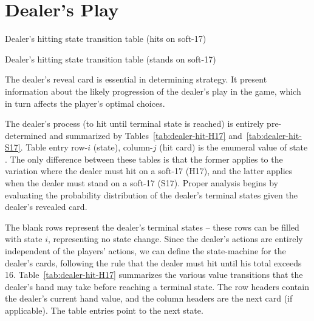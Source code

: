 \section{Dealer's Play}
\label{sec:rules:dealer-play}

\begin{table}[ht!]
\caption{Dealer's hitting state transition table (hits on soft-17)}
\begin{center}

\end{center}
\label{tab:dealer-hit-H17}
\end{table}

\begin{table}[ht!]
\caption{Dealer's hitting state transition table (stands on soft-17)}
\begin{center}

\end{center}
\label{tab:dealer-hit-S17}
\end{table}

The dealer's reveal card is essential in determining strategy.
It present information about the likely progression of the dealer's
play in the game, which in turn affects the player's optimal choices.

The dealer's process (to hit until terminal state is reached)
is entirely pre-determined and summarized by Tables~\ref{tab:dealer-hit-H17}
and~\ref{tab:dealer-hit-S17}.
Table entry row-$i$ (state), column-$j$ (hit card) is the enumeral value
of state .
The only difference between these tables is that the former
applies to the variation where the dealer must hit on a soft-17 (H17),
and the latter applies when the dealer must stand on a soft-17 (S17).
Proper analysis begins by evaluating the probability distribution
of the dealer's terminal states given the dealer's revealed card. 

The blank rows represent the dealer's terminal states --
these rows can be filled with state $i$, representing no state change.
Since the dealer's actions are entirely independent of 
the players' actions, we can define the state-machine
for the dealer's cards, following the rule that the dealer
must hit until his total exceeds 16.
Table~\ref{tab:dealer-hit-H17} summarizes the various
value transitions that the dealer's hand may take
before reaching a terminal state.
The row headers contain the dealer's current hand value, 
and the column headers are the next card (if applicable).
The table entries point to the next state.

